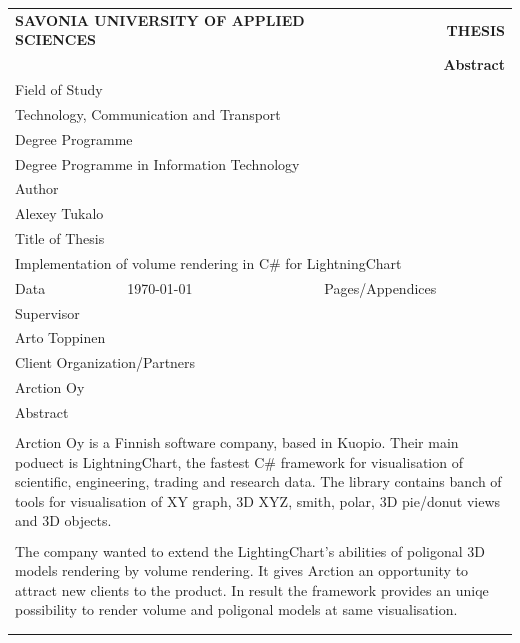 \documentclass[english]{report}
\begin{document}
\begin{table}[!h]
\begin{tabular}{| l | l | l | l |}
\multicolumn{2}{l}{\textbf{SAVONIA UNIVERSITY OF APPLIED SCIENCES}}&
\multicolumn{2}{r}{\textbf{THESIS}}\\
\multicolumn{4}{r}{\textbf{Abstract}}\\
\hline
\multicolumn{4}{|l|}{Field of Study}\\
\multicolumn{4}{|l|}{Technology, Communication and Transport}\\
\hline
\multicolumn{4}{|l|}{Degree Programme}\\
\multicolumn{4}{|l|}{Degree Programme in Information Technology}\\
\hline
\multicolumn{4}{|l|}{Author}\\
\multicolumn{4}{|l|}{Alexey Tukalo}\\
\hline
\multicolumn{4}{|l|}{Title of Thesis}\\
\multicolumn{4}{|l|}{Implementation of volume rendering in C\# for LightningChart}\\
\hline
Data & \today & Pages/Appendices & \pageref{LastPage}\\
\hline
\multicolumn{4}{|l|}{Supervisor}\\
\multicolumn{4}{|l|}{Arto Toppinen}\\
\hline
\multicolumn{4}{|l|}{Client Organization/Partners}\\
\multicolumn{4}{|l|}{Arction Oy}\\
\hline
\multicolumn{4}{|l|}{Abstract}\\
\multicolumn{4}{|l|}{ }\\
\multicolumn{4}{|p{14cm}|}{
Arction Oy is a Finnish software company, based in Kuopio. Their main poduect is LightningChart, the fastest C\# framework for visualisation of scientific, engineering, trading and research data. The library contains banch of tools for visualisation of XY graph, 3D XYZ, smith, polar, 3D pie/donut views and 3D objects.
}\\
\multicolumn{4}{|l|}{ }\\
\multicolumn{4}{|p{14cm}|}{
The company wanted to extend the LightingChart's abilities of poligonal 3D models rendering by volume rendering. It gives Arction an opportunity to attract new clients to the product. In result the framework provides an uniqe possibility to  render volume and poligonal models at same visualisation.
}\\
\multicolumn{4}{|l|}{ }\\
\multicolumn{4}{|p{14cm}|}{
}
\end{tabular}
\end{table}
\end{document}
